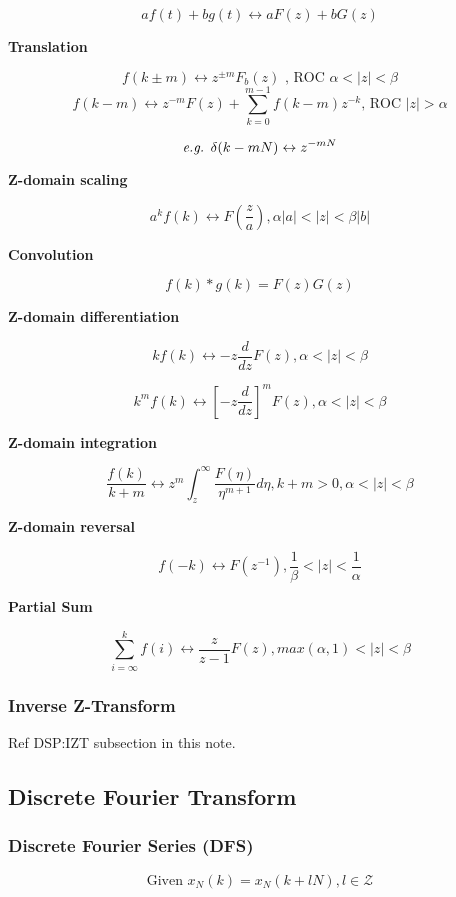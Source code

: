  \[ af(t) + bg(t) \leftrightarrow aF(z) + bG(z) \]

 {\bf Translation}

 \[ f(k\pm m) \leftrightarrow z^{\pm m} F_b(z) \text{ , ROC } \alpha < |z| < \beta\]
 \[ f(k - m) \leftrightarrow z^{-m}F(z) + \sum_{k=0}^{m-1} f(k-m)z^{-k} \text{, ROC } |z| > \alpha\]
 
 \[ \text{{\it e.g.   }} \delta(k-mN) \leftrightarrow z^{-mN}\]

 {\bf Z-domain scaling}

 \[ a^k f(k) \leftrightarrow F(\frac{z}{a}), \alpha|a| < |z| < \beta|b| \]

 {\bf Convolution}

 \[ f(k) * g(k) = F(z)G(z) \]

 {\bf Z-domain differentiation}

 \[ kf(k) \leftrightarrow -z \frac{d}{dz} F(z), \alpha < |z| < \beta\]

 \[ k^m f(k) \leftrightarrow [-z\frac{d}{dz}]^m F(z), \alpha < |z| < \beta\]

 {\bf Z-domain integration}

 \[ \frac{f(k)}{k+m} \leftrightarrow z^m \int_z^\infty \frac{F(\eta)}{\eta^{m+1}} d\eta, k+m > 0, \alpha < |z| < \beta\]

 {\bf Z-domain reversal}

 \[ f(-k) \leftrightarrow F(z^{-1}), \frac{1}{\beta} < |z| < \frac{1}{\alpha} \]

 {\bf Partial Sum}

 \[ \sum_{i=\infty}^k f(i) \leftrightarrow \frac{z}{z-1}F(z), max(\alpha, 1) < |z| < \beta\]

 \subsubsection{Inverse Z-Transform}

 Ref DSP:IZT subsection in this note.

\subsection{Discrete Fourier Transform}

 \subsubsection{Discrete Fourier Series (DFS)}

 \[ \text{Given } x_N(k) = x_N(k + lN), l \in \mathcal{Z}\]

